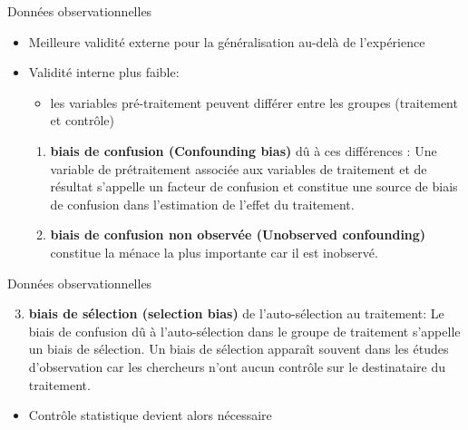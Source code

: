 \documentclass[ignorenonframetext,]{beamer}
\providecommand{\tightlist}{%
  \setlength{\itemsep}{0pt}\setlength{\parskip}{0pt}}
\begin{document}
\begin{frame}{Données observationnelles}
\protect\hypertarget{donnees-observationnelles-1}{}

\begin{itemize}
\tightlist
\item
  Meilleure validité externe pour la généralisation au-delà de
  l'expérience
\item
  Validité interne plus faible:

  \begin{itemize}
  \tightlist
  \item
    les variables pré-traitement peuvent différer entre les groupes
    (traitement et contrôle)
  \end{itemize}

  \begin{enumerate}
  \item
    \textbf{biais de confusion (Confounding bias)} dû à ces différences
    : Une variable de prétraitement associée aux variables de traitement
    et de résultat s'appelle un facteur de confusion et constitue une
    source de biais de confusion dans l'estimation de l'effet du
    traitement.
  \item
    \textbf{biais de confusion non observée (Unobserved confounding)}
    constitue la ménace la plus importante car il est inobservé.
  \end{enumerate}
\end{itemize}

\end{frame}

\begin{frame}{Données observationnelles}
\protect\hypertarget{donnees-observationnelles-2}{}

\begin{enumerate}
\setcounter{enumi}{2}
\tightlist
\item
  \textbf{biais de sélection (selection bias)} de l'auto-sélection au
  traitement: Le biais de confusion dû à l'auto-sélection dans le groupe
  de traitement s'appelle un biais de sélection. Un biais de sélection
  apparaît souvent dans les études d'observation car les chercheurs
  n'ont aucun contrôle sur le destinataire du traitement.
\end{enumerate}

\begin{itemize}
\tightlist
\item
  Contrôle statistique devient alors nécessaire
\end{itemize}

\end{frame}
\end{document}
